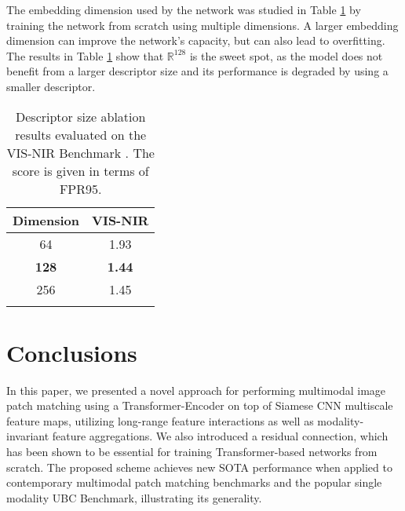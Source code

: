 \documentclass[10pt,journal]{IEEEtran}\usepackage{amsfonts}
\begin{document}
The embedding dimension used by the network was studied in Table \ref {table:ablation_desc} by training the network from scratch using multiple
dimensions. A larger embedding dimension can improve the network's capacity,
but can also lead to overfitting. The results in Table \ref {table:ablation_desc} show that $\mathbb{R}
^{128}$ is the sweet spot, as the model does not benefit from a larger
descriptor size and its performance is degraded by using a smaller
descriptor.
\begin{table}[tbh]
\centering
\begin{tabular}{cc}
\toprule Dimension & VIS-NIR \\
\midrule 64 & 1.93 \\
\textbf{128} & \textbf{1.44} \\
256 & 1.45 \\
\bottomrule &
\end{tabular}\caption{Descriptor size ablation results evaluated on the VIS-NIR Benchmark
\protect\cite{SiameseCrossSpectral}. The score is given in terms of FPR95.}
\label{table:ablation_desc}
\end{table}

\section{Conclusions}

In this paper, we presented a novel approach for performing multimodal image
patch matching using a Transformer-Encoder on top of Siamese CNN multiscale
feature maps, utilizing long-range feature interactions as well as
modality-invariant feature aggregations. We also introduced a residual
connection, which has been shown to be essential for training
Transformer-based networks from scratch. The proposed scheme achieves new
SOTA performance when applied to contemporary multimodal patch matching
benchmarks and the popular single modality UBC Benchmark, illustrating its
generality.





\end{document}
